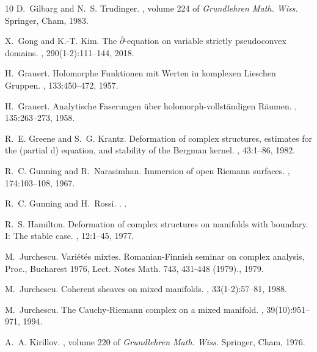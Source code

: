 \documentclass[11pt]{amsart}
\numberwithin{equation}{section}
\theoremstyle{definition}
\begin{document}
\begin{thebibliography}{10}
D.~Gilbarg and N.~S. Trudinger.
, volume 224 of {\em Grundlehren Math. Wiss.}
\newblock Springer, Cham, 1983.

X.~Gong and K.-T. Kim.
\newblock The {{\(\overline{\partial}\)}}-equation on variable strictly
  pseudoconvex domains.
, 290(1-2):111--144, 2018.

H.~Grauert.
\newblock Holomorphe {F}unktionen mit {W}erten in komplexen {L}ieschen
  {G}ruppen.
, 133:450--472, 1957.

H.~Grauert.
\newblock Analytische {F}aserungen \"uber holomorph-vollst{\"a}ndigen
  {R}{\"a}umen.
, 135:263--273, 1958.

R.~E. Greene and S.~G. Krantz.
\newblock Deformation of complex structures, estimates for the (partial d)
  equation, and stability of the {Bergman} kernel.
, 43:1--86, 1982.

R.~C. Gunning and R.~Narasimhan.
\newblock Immersion of open {R}iemann surfaces.
, 174:103--108, 1967.

R.~C. Gunning and H.~Rossi.
.
.

R.~S. Hamilton.
\newblock Deformation of complex structures on manifolds with boundary. {I}:
  {The} stable case.
, 12:1--45, 1977.

M.~Jurchescu.
\newblock Vari{\'e}t{\'e}s mixtes.
\newblock Romanian-{Finnish} seminar on complex analysis, {Proc}., {Bucharest}
  1976, {Lect}. {Notes} {Math}. 743, 431-448 (1979)., 1979.

M.~Jurchescu.
\newblock Coherent sheaves on mixed manifolds.
, 33(1-2):57--81, 1988.

M.~Jurchescu.
\newblock The {Cauchy}-{Riemann} complex on a mixed manifold.
, 39(10):951--971, 1994.

A.~A. Kirillov.
, volume 220 of {\em Grundlehren Math. Wiss.}
\newblock Springer, Cham, 1976.


\end{thebibliography}
\end{document}
